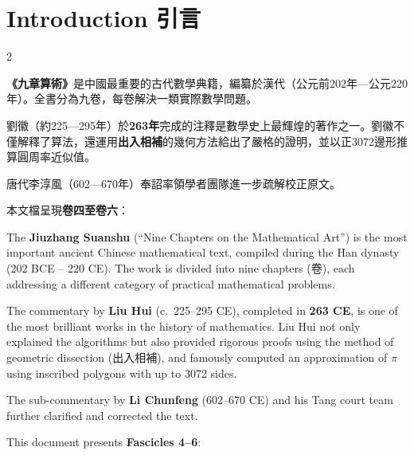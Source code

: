 \documentclass[10pt,a4paper]{article}
\begin{document}
\tableofcontents
\newpage

\section*{Introduction 引言}

\begin{paracol}{2}

\begin{leftcolumn*}
\textbf{《九章算術》}是中國最重要的古代數學典籍，編纂於漢代（公元前202年—公元220年）。全書分為九卷，每卷解決一類實際數學問題。

劉徽（約225—295年）於\textbf{263年}完成的注釋是數學史上最輝煌的著作之一。劉徽不僅解釋了算法，還運用\textbf{出入相補}的幾何方法給出了嚴格的證明，並以正3072邊形推算圓周率近似值。

唐代李淳風（602—670年）奉詔率領學者團隊進一步疏解校正原文。

本文檔呈現\textbf{卷四至卷六}：
\end{leftcolumn*}

\begin{rightcolumn*}
The \textbf{Jiuzhang Suanshu} (``Nine Chapters on the Mathematical Art'') is the most important ancient Chinese mathematical text, compiled during the Han dynasty (202 BCE -- 220 CE). The work is divided into nine chapters (卷), each addressing a different category of practical mathematical problems.

The commentary by \textbf{Liu Hui} (c.\ 225--295 CE), completed in \textbf{263 CE}, is one of the most brilliant works in the history of mathematics. Liu Hui not only explained the algorithms but also provided rigorous proofs using the method of geometric dissection (出入相補), and famously computed an approximation of $\pi$ using inscribed polygons with up to 3072 sides.

The sub-commentary by \textbf{Li Chunfeng} (602--670 CE) and his Tang court team further clarified and corrected the text.

This document presents \textbf{Fascicles 4--6}:
\end{rightcolumn*}

\end{paracol}
\end{document}
